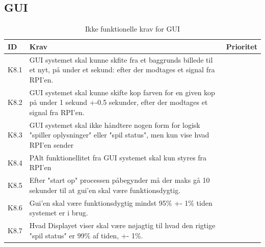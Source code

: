 \documentclass[Kravspecifikation/Kravspec_Main.tex]{subfiles}
\begin{document}
\subsection{GUI}
\begin{table}[H]
\begin{tabular}{|L{0.1\textwidth}|L{0.75\textwidth}|L{0.15\textwidth}|}
\hline
\textbf{ID} & \textbf{Krav} & \textbf{Prioritet} \\ \hline
K8.1 & GUI systemet skal kunne skfite fra et baggrunds billede til et nyt, på under et sekund: efter der modtages et signal fra RPI'en.  & \\ \hline
K8.2 & GUI systemet skal kunne skifte kop farven for en given kop på under 1 sekund +-0.5 sekunder, efter der modtages et signal fra RPI'en. & \\ \hline
K8.3 & GUI systemet skal ikke håndtere nogen form for logisk "spiller oplysninger" eller "spil status", men kun vise hvad RPI'en sender & \\ \hline
K8.4 & PAlt funktionellitet fra GUI systemet skal kun styres fra RPI'en & \\ \hline
K8.5 & Efter "start op" processen påbegynder må der maks gå 10 sekunder til at gui'en skal være funktionsdygtig. & \\ \hline
K8.6 & Gui'en skal være funktionsdygtig mindst 95\% +- 1\% tiden systemet er i brug. & \\ \hline
K8.7 & Hvad Displayet viser skal være nøjagtig til hvad den rigtige "spil status" er 99\%  af tiden, +- 1\%. & \\ \hline
\end{tabular}
\caption{Ikke funktionelle krav for GUI}
\label{tab:GUI}
\end{table}
\end{document}
